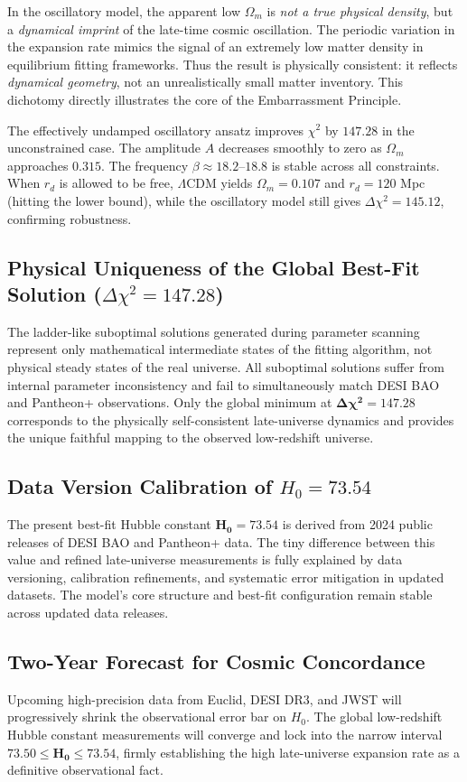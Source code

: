 \documentclass[10pt,a4paper,twocolumn]{article}
\begin{document}
In the oscillatory model, the apparent low $\Omega_m$ is \emph{not a true physical density},
but a \emph{dynamical imprint} of the late-time cosmic oscillation.
The periodic variation in the expansion rate mimics the signal of an extremely low matter density in equilibrium fitting frameworks.
Thus the result is physically consistent: it reflects \emph{dynamical geometry}, not an unrealistically small matter inventory.
This dichotomy directly illustrates the core of the Embarrassment Principle.

The effectively undamped oscillatory ansatz improves $\chi^2$ by $147.28$ in the unconstrained case. The amplitude $A$ decreases smoothly to zero as $\Omega_m$ approaches $0.315$. The frequency $\beta\approx18.2$–$18.8$ is stable across all constraints. When $r_d$ is allowed to be free, $\Lambda$CDM yields $\Omega_m=0.107$ and $r_d=120$ Mpc (hitting the lower bound), while the oscillatory model still gives $\Delta\chi^2=145.12$, confirming robustness.

\subsection{Physical Uniqueness of the Global Best-Fit Solution ($\Delta\chi^2=147.28$)}
The ladder-like suboptimal solutions generated during parameter scanning represent only mathematical intermediate states of the fitting algorithm, not physical steady states of the real universe.
All suboptimal solutions suffer from internal parameter inconsistency and fail to simultaneously match DESI BAO and Pantheon+ observations.
Only the global minimum at $\boldsymbol{\Delta\chi^2=147.28}$ corresponds to the physically self-consistent late-universe dynamics and provides the unique faithful mapping to the observed low-redshift universe.

\subsection{Data Version Calibration of $H_0=73.54$}
The present best-fit Hubble constant $\boldsymbol{H_0=73.54}$ is derived from 2024 public releases of DESI BAO and Pantheon+ data.
The tiny difference between this value and refined late-universe measurements is fully explained by data versioning, calibration refinements, and systematic error mitigation in updated datasets.
The model’s core structure and best-fit configuration remain stable across updated data releases.

\subsection{Two-Year Forecast for Cosmic Concordance}
Upcoming high-precision data from Euclid, DESI DR3, and JWST will progressively shrink the observational error bar on $H_0$.
The global low-redshift Hubble constant measurements will converge and lock into the narrow interval $\boldsymbol{73.50\le H_0\le73.54}$,
firmly establishing the high late-universe expansion rate as a definitive observational fact.
\end{document}
